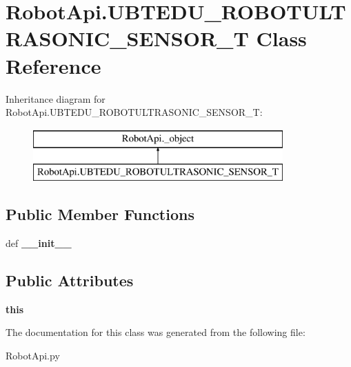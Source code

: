 \hypertarget{classRobotApi_1_1UBTEDU__ROBOTULTRASONIC__SENSOR__T}{\section{Robot\+Api.\+U\+B\+T\+E\+D\+U\+\_\+\+R\+O\+B\+O\+T\+U\+L\+T\+R\+A\+S\+O\+N\+I\+C\+\_\+\+S\+E\+N\+S\+O\+R\+\_\+\+T Class Reference}
\label{classRobotApi_1_1UBTEDU__ROBOTULTRASONIC__SENSOR__T}
}
Inheritance diagram for Robot\+Api.\+U\+B\+T\+E\+D\+U\+\_\+\+R\+O\+B\+O\+T\+U\+L\+T\+R\+A\+S\+O\+N\+I\+C\+\_\+\+S\+E\+N\+S\+O\+R\+\_\+\+T\+:\begin{figure}[H]
\begin{center}
\leavevmode
\includegraphics[height=2.000000cm]{classRobotApi_1_1UBTEDU__ROBOTULTRASONIC__SENSOR__T}
\end{center}
\end{figure}
\subsection*{Public Member Functions}
\begin{DoxyCompactItemize}
\item 
\hypertarget{classRobotApi_1_1UBTEDU__ROBOTULTRASONIC__SENSOR__T_ae9a80c764b0ddf164115b236efe19967}{def {\bfseries \+\_\+\+\_\+init\+\_\+\+\_\+}}\label{classRobotApi_1_1UBTEDU__ROBOTULTRASONIC__SENSOR__T_ae9a80c764b0ddf164115b236efe19967}

\end{DoxyCompactItemize}
\subsection*{Public Attributes}
\begin{DoxyCompactItemize}
\item 
\hypertarget{classRobotApi_1_1UBTEDU__ROBOTULTRASONIC__SENSOR__T_a7b83fa3c4a57a14ed367dc3a6e5e9cc0}{{\bfseries this}}\label{classRobotApi_1_1UBTEDU__ROBOTULTRASONIC__SENSOR__T_a7b83fa3c4a57a14ed367dc3a6e5e9cc0}

\end{DoxyCompactItemize}


The documentation for this class was generated from the following file\+:\begin{DoxyCompactItemize}
\item 
Robot\+Api.\+py\end{DoxyCompactItemize}

